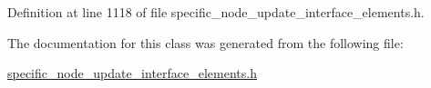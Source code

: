 Definition at line 1118 of file specific\+\_\+node\+\_\+update\+\_\+interface\+\_\+elements.\+h.



The documentation for this class was generated from the following file\+:\begin{DoxyCompactItemize}
\item 
\hyperlink{specific__node__update__interface__elements_8h}{specific\+\_\+node\+\_\+update\+\_\+interface\+\_\+elements.\+h}\end{DoxyCompactItemize}

